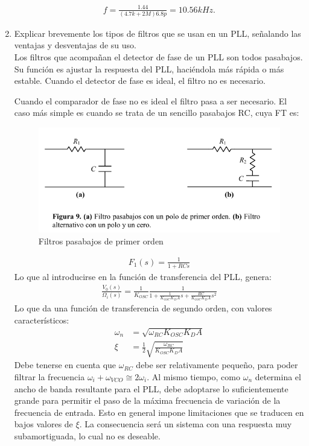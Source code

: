 \begin{enumerate}[label=\alph*)]
    \begin{align*}
        f = \frac{1.44}{(4.7k+2M)6.8p} = 10.56kHz.
    \end{align*}
    \newpage
    \item Explicar brevemente los tipos de filtros que se usan en un PLL, señalando las ventajas y desventajas de su uso.\\
    Los filtros que acompañan el detector de fase de un PLL son todos pasabajos. Su función es ajustar la respuesta del PLL, haciéndola más rápida o más estable. Cuando el detector de fase es ideal, el filtro no es necesario.
    
    Cuando el comparador de fase no es ideal el filtro pasa a ser necesario. El caso más simple es cuando se trata de un sencillo pasabajos RC, cuya FT es\cite{PLL}:
    \begin{figure}[H]
        \centering
        \includegraphics[width=.7\textwidth]{imgs/3.2. PLL Filtros.png}
        \caption{Filtros pasabajos de primer orden\cite{PLL}}
    \end{figure}
    \begin{align*}
        F_1(s)=\frac{1}{1+RCs}
    \end{align*}
    Lo que al introducirse en la función de transferencia del PLL, genera:
    \begin{align*}
        \frac{V_0(s)}{\Omega_i(s)} = \frac{1}{K_{OSC}}\frac{1}{1 + \frac{1}{K_{OSC}K_DA}s + \frac{RC}{K_{OSC}K_DA}s^2}
    \end{align*}
    Lo que da una función de transferencia de segundo orden, con valores característicos:
    \begin{align*}
        \omega_n &= \sqrt{\omega_{RC}K_{OSC}K_DA}\\
        \xi &= \frac{1}{2}\sqrt{\frac{\omega_{RC}}{K_{OSC}K_DA}}
    \end{align*}
    Debe tenerse en cuenta que $\omega_{RC}$ debe ser relativamente pequeño, para poder filtrar la frecuencia $\omega_i + \omega_{VCO} \cong 2\omega_i$. Al mismo tiempo, como $\omega_n$ determina el ancho de banda resultante para el PLL, debe adoptarse lo suficientemente grande para permitir el paso de la máxima frecuencia de variación de la frecuencia de entrada. Esto en general impone limitaciones que se traducen en  bajos valores de $\xi$. La consecuencia será un sistema con una respuesta muy subamortiguada, lo cual no es deseable.


\end{enumerate}
